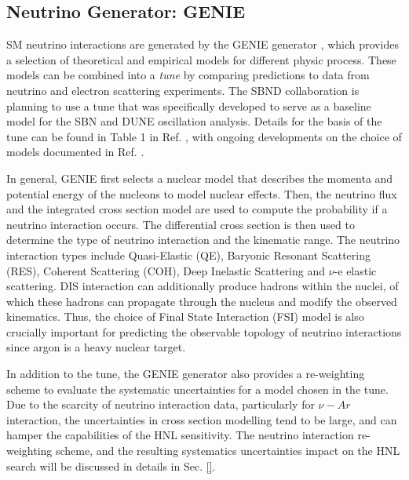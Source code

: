 \subsection{Neutrino Generator: GENIE}
\label{sec:gen_genie}



SM neutrino interactions are generated by the GENIE generator \cite{genie}, which provides a selection of theoretical and empirical models for different physic process.
These models can be combined into a \textit{tune} by comparing predictions to data from neutrino and electron scattering experiments.
The SBND collaboration is planning to use a tune that was specifically developed to serve as a baseline model for the SBN and DUNE oscillation analysis.
Details for the basis of the tune can be found in Table 1 in Ref. \cite{genie_tune}, with ongoing developments on the choice of models documented in Ref. \cite{genie_tune_github}.  

In general, GENIE first selects a nuclear model that describes the momenta and potential energy of the nucleons to model nuclear effects.
Then, the neutrino flux and the integrated cross section model are used to compute the probability if a neutrino interaction occurs.
The differential cross section is then used to determine the type of neutrino interaction and the kinematic range.
The neutrino interaction types include Quasi-Elastic (QE), Baryonic Resonant Scattering (RES), Coherent Scattering (COH), Deep Inelastic Scattering and $\nu$-e elastic scattering.
DIS interaction can additionally produce hadrons within the nuclei, of which these hadrons can propagate through the nucleus and modify the observed kinematics.
Thus, the choice of Final State Interaction (FSI) model is also crucially important for predicting the observable topology of neutrino interactions since argon is a heavy nuclear target.

In addition to the tune, the GENIE generator also provides a re-weighting scheme to evaluate the systematic uncertainties for a model chosen in the tune.
Due to the scarcity of neutrino interaction data, particularly for $\nu-Ar$ interaction, the uncertainties in cross section modelling tend to be large, and can hamper the capabilities of the HNL sensitivity.  
The neutrino interaction re-weighting scheme, and the resulting systematics uncertainties impact on the HNL search will be discussed in details in Sec. \ref{}.


